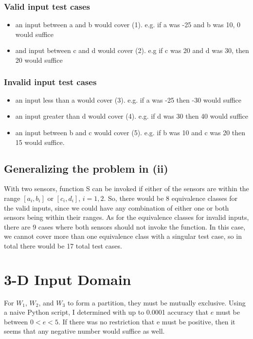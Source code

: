 \documentclass[letterpaper]{article}
\begin{document}
\subsubsection*{Valid input test cases}
\begin{itemize}
	\item an input between a and b would cover (1). e.g. if a was -25 and b
		was 10, 0 would suffice
	\item and input between c and d would cover (2). e.g if c was 20 and d
		was 30, then 20 would suffice
\end{itemize}

\subsubsection*{Invalid input test cases}
\begin{itemize}
	\item an input less than a would cover (3). e.g. if a was -25 then -30
		would suffice
	\item an input greater than d would cover (4). e.g. if d was 30 then 40
		would suffice
	\item an input between b and c would cover (5). e.g. if b was 10 and c
		was 20 then 15 would suffice.
\end{itemize}

\subsection{Generalizing the problem in (ii)}
With two sensors, function S can be invoked if either of the sensors are within
the range $[a_i, b_i]$ or $[c_i, d_i]$, $i=1,2$. So, there would be 8
equivalence classes for the valid inputs, since we could have any combination
of either one or both sensors being within their ranges. As for the
equivalence classes for invalid inputs, there are 9 cases where both sensors
should not invoke the function. In this case, we cannot cover more than one
equivalence class with a singular test case, so in total there would be 17
total test cases.

\section{3-D Input Domain}
For $W_1$, $W_2$, and $W_3$ to form a partition, they must be mutually
exclusive. Using a naive Python script, I determined with up to 0.0001 accuracy
that $e$ must be between $0 < e < 5$. If there was no restriction that e
must be positive, then it seems that any negative number would suffice as well.
\end{document}
